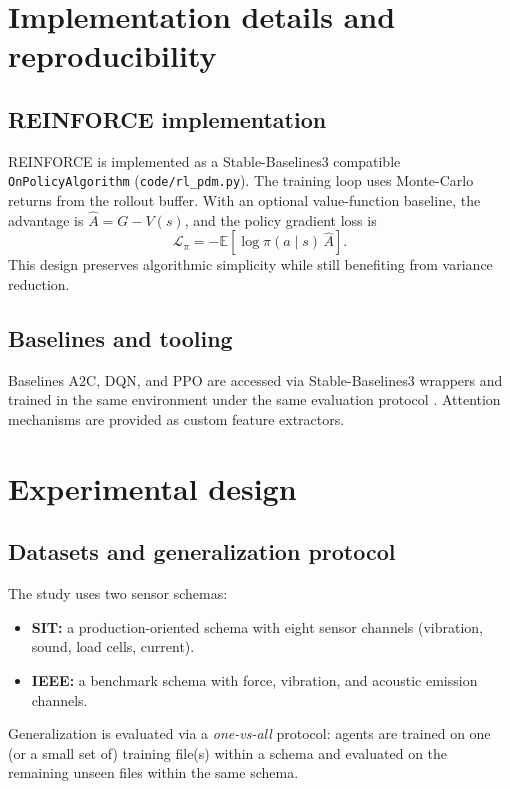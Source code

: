 \documentclass[11pt]{article}
\begin{document}
\section{Implementation details and reproducibility}
\label{sec:implementation}
\subsection{REINFORCE implementation}
\label{sec:reinforce_impl}
REINFORCE is implemented as a Stable-Baselines3 compatible \texttt{OnPolicyAlgorithm} (\texttt{code/rl\_pdm.py}). The training loop uses Monte-Carlo returns from the rollout buffer. With an optional value-function baseline, the advantage is $\hat{A}=G-V(s)$, and the policy gradient loss is
\begin{equation}
	\mathcal{L}_{\pi} = -\mathbb{E}[\log\pi(a\mid s)\,\hat{A}].
\end{equation}
This design preserves algorithmic simplicity while still benefiting from variance reduction.

\subsection{Baselines and tooling}
Baselines A2C, DQN, and PPO are accessed via Stable-Baselines3 wrappers and trained in the same environment under the same evaluation protocol \parencite{StableBaselines3}. Attention mechanisms are provided as custom feature extractors.

\section{Experimental design}
\label{sec:experiment}
\subsection{Datasets and generalization protocol}
The study uses two sensor schemas:
\begin{itemize}
	\item \textbf{SIT:} a production-oriented schema with eight sensor channels (vibration, sound, load cells, current).
	\item \textbf{IEEE:} a benchmark schema with force, vibration, and acoustic emission channels.
\end{itemize}

Generalization is evaluated via a \emph{one-vs-all} protocol: agents are trained on one (or a small set of) training file(s) within a schema and evaluated on the remaining unseen files within the same schema.
\end{document}
